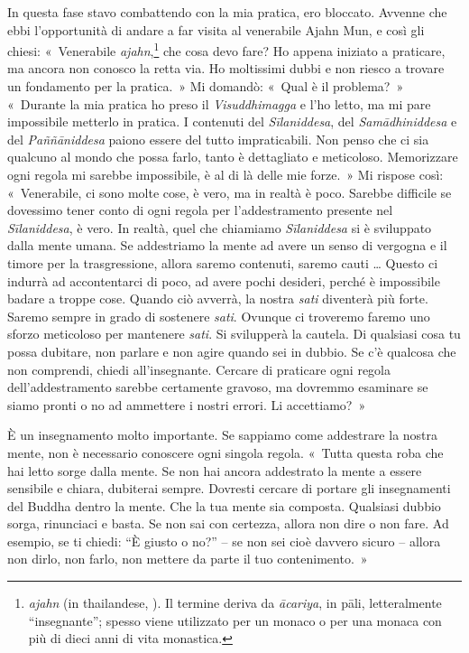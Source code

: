 In questa fase stavo combattendo con la mia pratica, ero bloccato.
Avvenne che ebbi l'opportunità di andare a far visita al venerabile
Ajahn Mun, e così gli chiesi: «~Venerabile \emph{ajahn},\footnote{\emph{ajahn}
  (in thailandese, ).
  Il termine deriva da \emph{ācariya}, in pāli, letteralmente
  ``insegnante''; spesso viene utilizzato per un monaco o per una monaca
  con più di dieci anni di vita monastica.} che cosa devo fare? Ho
appena iniziato a praticare, ma ancora non conosco la retta via. Ho
moltissimi dubbi e non riesco a trovare un fondamento per la pratica.~»
Mi domandò: «~Qual è il problema?~» «~Durante la mia pratica ho preso il
\emph{Visuddhimagga} e l'ho letto, ma mi pare impossibile metterlo in
pratica. I contenuti del \emph{Sīlaniddesa}, del \emph{Samādhiniddesa} e
del \emph{Paññāniddesa} paiono essere del tutto impraticabili. Non penso
che ci sia qualcuno al mondo che possa farlo, tanto è dettagliato e
meticoloso. Memorizzare ogni regola mi sarebbe impossibile, è al di là
delle mie forze.~» Mi rispose così: «~Venerabile, ci sono molte cose, è
vero, ma in realtà è poco. Sarebbe difficile se dovessimo tener conto di
ogni regola per l'addestramento presente nel \emph{Sīlaniddesa}, è vero.
In realtà, quel che chiamiamo \emph{Sīlaniddesa} si è sviluppato dalla
mente umana. Se addestriamo la mente ad avere un senso di vergogna e il
timore per la trasgressione, allora saremo contenuti, saremo cauti \ldots{}
Questo ci indurrà ad accontentarci di poco, ad avere pochi desideri,
perché è impossibile badare a troppe cose. Quando ciò avverrà, la nostra
\emph{sati} diventerà più forte. Saremo sempre in grado di sostenere
\emph{sati}. Ovunque ci troveremo faremo uno sforzo meticoloso per
mantenere \emph{sati}. Si svilupperà la cautela. Di qualsiasi cosa tu
possa dubitare, non parlare e non agire quando sei in dubbio. Se c'è
qualcosa che non comprendi, chiedi all'insegnante. Cercare di praticare
ogni regola dell'addestramento sarebbe certamente gravoso, ma dovremmo
esaminare se siamo pronti o no ad ammettere i nostri errori. Li
accettiamo?~»

È un insegnamento molto importante. Se sappiamo come addestrare la
nostra mente, non è necessario conoscere ogni singola regola. «~Tutta
questa roba che hai letto sorge dalla mente. Se non hai ancora
addestrato la mente a essere sensibile e chiara, dubiterai sempre.
Dovresti cercare di portare gli insegnamenti del Buddha dentro la mente.
Che la tua mente sia composta. Qualsiasi dubbio sorga, rinunciaci e
basta. Se non sai con certezza, allora non dire o non fare. Ad esempio,
se ti chiedi: ``È giusto o no?'' -- se non sei cioè davvero sicuro --
allora non dirlo, non farlo, non mettere da parte il tuo contenimento.~»

